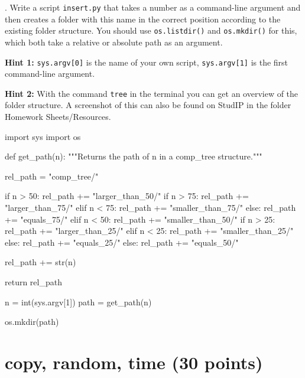 \vspace{1em}

. Write a script \texttt{insert.py} that takes a number as a command-line argument and then creates a folder with this name in the correct position according to the existing folder structure. You should use \texttt{os.listdir()} and \texttt{os.mkdir()} for this, which both take a relative or absolute path as an argument.

\vspace{1em}

\noindent \textbf{Hint 1:} \texttt{sys.argv[0]} is the name of your own script, \texttt{sys.argv[1]} is the first command-line argument.

\noindent \textbf{Hint 2:} With the command \texttt{tree} in the terminal you can get an overview of the folder structure. A screenshot of this can also be found on StudIP in the folder Homework Sheets/Resources.

\vspace{1em}

\begin{solution}

\begin{pythoncode}

import sys
import os

def get_path(n):
    """Returns the path of n in a comp_tree structure."""

    rel_path = "comp_tree/"
        
    if n > 50:
        rel_path += "larger_than_50/"
        if n > 75:
            rel_path += "larger_than_75/"
        elif n < 75:
            rel_path += "smaller_than_75/"
        else:
            rel_path += "equals_75/"
    elif n < 50:
        rel_path += "smaller_than_50/"
        if n > 25:
            rel_path += "larger_than_25/"
        elif n < 25:
            rel_path += "smaller_than_25/"
        else:
            rel_path += "equals_25/"
    else:
        rel_path += "equals_50/"

    rel_path += str(n)

    return rel_path

    
n = int(sys.argv[1])
path = get_path(n)

os.mkdir(path)

\end{pythoncode}

\end{solution}

\section{copy, random, time (30 points)}

